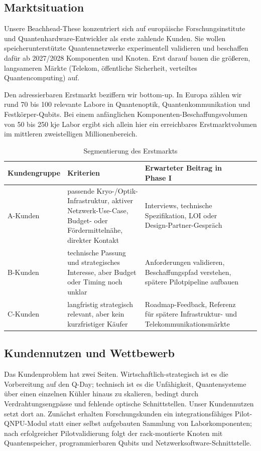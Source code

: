 \documentclass[11pt,oneside]{scrartcl}
\begin{document}
\subsection{Marktsituation}
Unsere Beachhead-These konzentriert sich auf europ\"aische Forschungsinstitute und Quantenhardware-Entwickler als erste zahlende Kunden. Sie wollen speicherunterst\"utzte Quantennetzwerke experimentell validieren und beschaffen daf\"ur ab 2027/2028 Komponenten und Knoten. Erst darauf bauen die gr\"o\ss eren, langsameren M\"arkte (Telekom, \"offentliche Sicherheit, verteiltes Quantencomputing) auf.

Den adressierbaren Erstmarkt beziffern wir bottom-up. In Europa z\"ahlen wir rund 70 bis 100 relevante Labore in Quantenoptik, Quantenkommunikation und Festk\"orper-Qubits. Bei einem anf\"anglichen Komponenten-Beschaffungsvolumen von 50 bis 250 k\texteuro je Labor ergibt sich allein hier ein erreichbares Erstmarktvolumen im mittleren zweistelligen Millionenbereich.

\begin{table}[ht]
\centering
\small
\begin{tabularx}{\textwidth}{>{\raggedright\arraybackslash}p{} X X X X}
\toprule
Kundengruppe & Kriterien & Erwarteter Beitrag in Phase I \\
\midrule
A-Kunden & passende Kryo-/Optik-Infrastruktur, aktiver Netzwerk-Use-Case, Budget- oder F\"ordermitteln\"ahe, direkter Kontakt & Interviews, technische Spezifikation, LOI oder Design-Partner-Gespr\"ach \\
B-Kunden & technische Passung und strategisches Interesse, aber Budget oder Timing noch unklar & Anforderungen validieren, Beschaffungspfad verstehen, sp\"atere Pilotpipeline aufbauen \\
C-Kunden & langfristig strategisch relevant, aber kein kurzfristiger K\"aufer & Roadmap-Feedback, Referenz f\"ur sp\"atere Infrastruktur- und Telekommunikationsm\"arkte \\
\bottomrule
\end{tabularx}
\caption{Segmentierung des Erstmarkts}
\end{table}

\subsection{Kundennutzen und Wettbewerb}
Das Kundenproblem hat zwei Seiten. Wirtschaftlich-strategisch ist es die Vorbereitung auf den Q-Day; technisch ist es die Unf\"ahigkeit, Quantensysteme \"uber einen einzelnen K\"uhler hinaus zu skalieren, bedingt durch Verdrahtungsengp\"asse und fehlende optische Schnittstellen. Unser Kundennutzen setzt dort an. Zun\"achst erhalten Forschungskunden ein integrationsf\"ahiges Pilot-QNPU-Modul statt einer selbst aufgebauten Sammlung von Laborkomponenten; nach erfolgreicher Pilotvalidierung folgt der rack-montierte Knoten mit Quantenspeicher, programmierbaren Qubits und Netzwerksoftware-Schnittstelle.
\end{document}
